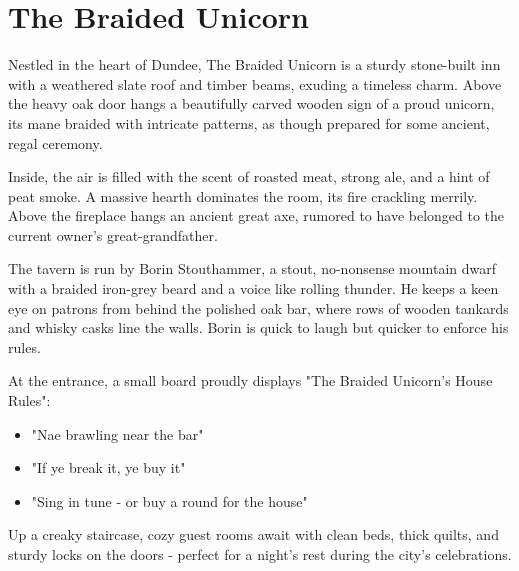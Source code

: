 \section*{The Braided Unicorn}
{\entryfont Nestled in the heart of Dundee, The Braided Unicorn is a sturdy stone-built inn with a weathered slate roof and timber beams, exuding a timeless charm. Above the heavy oak door hangs a beautifully carved wooden sign of a proud unicorn, its mane braided with intricate patterns, as though prepared for some ancient, regal ceremony.

Inside, the air is filled with the scent of roasted meat, strong ale, and a hint of peat smoke. A massive hearth dominates the room, its fire crackling merrily. Above the fireplace hangs an ancient great axe, rumored to have belonged to the current owner's great-grandfather.

The tavern is run by Borin Stouthammer, a stout, no-nonsense mountain dwarf with a braided iron-grey beard and a voice like rolling thunder. He keeps a keen eye on patrons from behind the polished oak bar, where rows of wooden tankards and whisky casks line the walls. Borin is quick to laugh but quicker to enforce his rules.

At the entrance, a small board proudly displays "The Braided Unicorn's House Rules":
\begin{itemize}
	\item "Nae brawling near the bar"
	\item "If ye break it, ye buy it"
	\item "Sing in tune - or buy a round for the house"
\end{itemize}

Up a creaky staircase, cozy guest rooms await with clean beds, thick quilts, and sturdy locks on the doors - perfect for a night's rest during the city's celebrations.}
